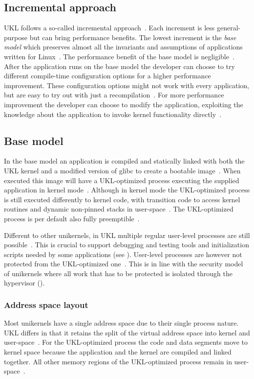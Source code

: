 \documentclass[10pt,twocolumn,a4paper]{article}
\begin{document}
  \subsection{Incremental approach}
    UKL follows a so-called incremental approach~\cite{raza23}. 
    Each increment is less general-purpose but can bring performance benefits.
    The lowest increment is the \textit{base model} which preserves almost all the 
    invariants and assumptions of applications written for Linux~\cite{raza23}.
    The performance benefit of the base model is negligible~\cite{raza23}.
    After the application runs on the base model the developer can choose to try different
    compile-time configuration options for a higher performance improvement.
    These configuration options might not work with every application, but are easy to try out
    with just a recompilation~\cite{raza23}.
    For more performance improvement the developer can choose to modify the application, exploiting the
    knowledge about the application to invoke kernel functionality directly~\cite{raza23}.

  \subsection{Base model}\label{sec:base-model}
    In the base model an application is compiled and statically linked with both 
    the UKL kernel and a modified version of glibc to create a bootable image~\cite{raza23}.
    When executed this image will have a UKL-optimized process executing the supplied 
    application in kernel mode~\cite{raza23}.
    Although in kernel mode the UKL-optimized process is still executed differently to kernel code,
    with transition code to access kernel routines and dynamic non-pinned stacks in user-space~\cite{raza23}.
    The UKL-optimized process is per default also fully preemptible~\cite{raza23}.

    Different to other unikernels, in UKL multiple regular user-level processes are still possible~\cite{raza23}.
    This is crucial to support debugging and testing tools and initialization scripts needed by
    some applications (see ).
    User-level processes are however not protected from the UKL-optimized one~\cite{raza23}.
    This is in line with the security model of unikernels where all work that has to 
    be protected is isolated through the hypervisor ().

    \subsubsection{Address space layout}
      Most unikernels have a single address space due to their single process nature.
      UKL differs in that it retains the split of the virtual address space into kernel 
      and user-space~\cite{raza23}.
      For the UKL-optimized process the code and data segments move to kernel space because
      the application and the kernel are compiled and linked together.
      All other memory regions of the UKL-optimized process remain in user-space~\cite{raza23}.
\end{document}
